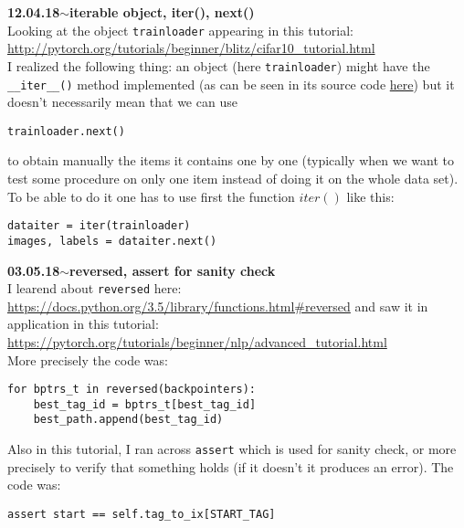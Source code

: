 \documentclass[11pt,a4paper]{article}
\newenvironment{loggentry}[2]%
{\noindent\textbf{#1}\hspace{1cm}$\mathbf{\sim}$\text{ }\textbf{#2}\\}{\vspace{0.5cm}}
\begin{document}
\begin{loggentry}{12.04.18}{iterable object, iter(), next()}
Looking at the object \texttt{trainloader} appearing in this tutorial:\\
\url{http://pytorch.org/tutorials/beginner/blitz/cifar10_tutorial.html}\\
I realized the following thing: an object (here \texttt{trainloader}) might have the \texttt{\_\_iter\_\_()} method implemented (as can be seen in its source code \href{http://pytorch.org/docs/master/_modules/torch/utils/data/dataloader.html}{here}) but it doesn't necessarily mean that we can use\\
\begin{verbatim}
trainloader.next()
\end{verbatim}
to obtain manually the items it contains one by one (typically when we want to test some procedure on only one item instead of doing it on the whole data set). To be able to do it one has to use first the function $iter()$ like this:\\
\begin{verbatim}
dataiter = iter(trainloader)
images, labels = dataiter.next()
\end{verbatim}
\end{loggentry}

\begin{loggentry}{03.05.18}{reversed, assert for sanity check}
I learend about \texttt{reversed} here:\\
\url{https://docs.python.org/3.5/library/functions.html#reversed}
and saw it in application in this tutorial:\\
\url{https://pytorch.org/tutorials/beginner/nlp/advanced_tutorial.html}\\
More precisely the code was:
\begin{verbatim}
for bptrs_t in reversed(backpointers):
    best_tag_id = bptrs_t[best_tag_id]
    best_path.append(best_tag_id)
\end{verbatim}
Also in this tutorial, I ran across \texttt{assert} which is used for sanity check, or more precisely to verify that something holds (if it doesn't it produces an error). The code was:
\begin{verbatim}
assert start == self.tag_to_ix[START_TAG]
\end{verbatim}
\end{loggentry}
\end{document}
